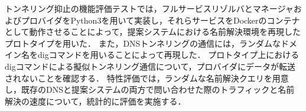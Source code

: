 トンネリング抑止の機能評価テストでは，フルサービスリゾルバとマネージャおよびプロバイダをPython3を用いて実装し，それらサービスをDockerのコンテナとして動作させることによって，提案システムにおける名前解決環境を再現したプロトタイプを用いた．
また，DNSトンネリングの通信には，ランダムなドメイン名をdigコマンドを用いることによって再現した．
プロトタイプ上におけるdigコマンドによる擬似トンネリング通信について，プロバイダにデータが転送されないことを確認する．
特性評価では，ランダムな名前解決クエリを用意し，既存のDNSと提案システムの両方で問い合わせた際のトラフィックと名前解決の速度について，統計的に評価を実施する．
%
%
%
%

